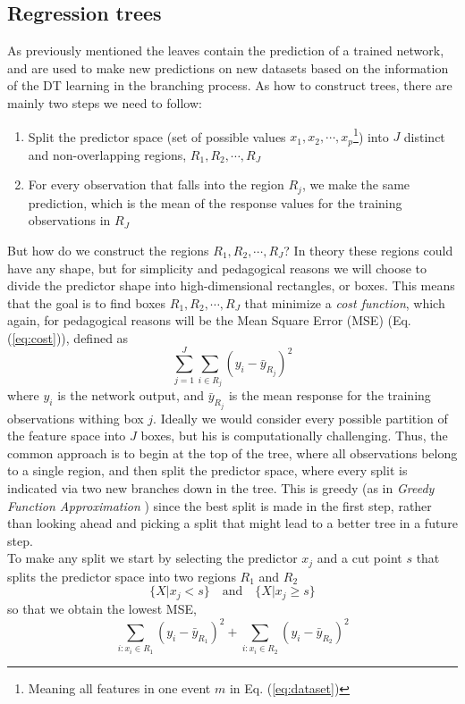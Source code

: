\documentclass[12pt, a4paper]{book}
\begin{document}
\subsection{Regression trees}
As previously mentioned the leaves contain the prediction of a trained network, and are used to make new predictions on new datasets based on the information of the DT learning in the branching process. As how to construct trees, there are mainly two steps we need to follow:
\begin{enumerate}
    \item Split the predictor space (set of possible values $x_1,x_2,\cdots,x_p$\footnote{Meaning all features in one event $m$ in Eq. (\ref{eq:dataset})}) into $J$ distinct and non-overlapping regions, $R_1,R_2,\cdots,R_J$
    \item For every observation that falls into the region $R_j$, we make the same prediction, which is the mean of the response values for the training observations in $R_J$
\end{enumerate}
But how do we construct the regions $R_1,R_2,\cdots,R_J$? In theory these regions could have any shape, but for simplicity and pedagogical reasons we will choose to divide the predictor shape into high-dimensional rectangles, or boxes. This means that the goal is to find boxes 
$R_1,R_2,\cdots,R_J$ that minimize a \textit{cost function}, which again, for pedagogical reasons will be the Mean Square Error (MSE) (Eq. (\ref{eq:cost})), defined as 
$$
\sum_{j=1}^{J}\sum_{i\in R_j}(y_i -\bar{y}_{R_j})^2
$$
where $y_i$ is the network output, and $\bar{y}_{R_j}$ is the mean response for the training observations withing box $j$. Ideally we would consider every possible partition of the feature space into $J$ boxes, but his is computationally challenging. Thus, the common approach is to begin at the top of the tree, 
where all observations belong to a single region, and then split the predictor space, where every split is indicated via two new branches down in the tree. This is greedy (as in \textit{Greedy Function Approximation} \cite{BDT_Friedman}) since the best split is made in the first step, 
rather than looking ahead and picking a split that might lead to a better tree in a future step.\\ 
To make any split we start by selecting the predictor $x_j$ and a cut point $s$ that splits the predictor space into two regions $R_1$ and $R_2$
$$
\{X\vert x_j < s\} \quad\text{and}\quad \{X\vert x_j \ge s\}
$$
so that we obtain the lowest MSE, 
$$
\sum_{i:x_i\in R_1}(y_i-\bar{y}_{R_1})^2 + \sum_{i:x_i\in R_2}(y_i-\bar{y}_{R_2})^2
$$
\end{document}
